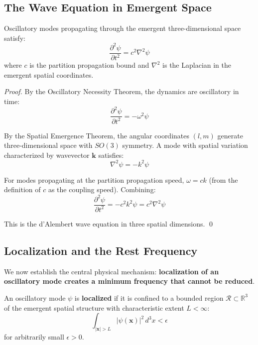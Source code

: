 \subsection{The Wave Equation in Emergent Space}

\begin{theorem}
\label{thm:wave-equation}
Oscillatory modes propagating through the emergent three-dimensional space satisfy:
\begin{equation}
    \frac{\partial^2 \psi}{\partial t^2} = c^2 \nabla^2 \psi
    \label{eq:wave-eq-3d}
\end{equation}
where $c$ is the partition propagation bound and $\nabla^2$ is the Laplacian in the emergent spatial coordinates.
\end{theorem}

\begin{proof}
By the Oscillatory Necessity Theorem, the dynamics are oscillatory in time:
\begin{equation}
    \frac{\partial^2 \psi}{\partial t^2} = -\omega^2 \psi
\end{equation}

By the Spatial Emergence Theorem, the angular coordinates $(l, m)$ generate three-dimensional space with $SO(3)$ symmetry. A mode with spatial variation characterized by wavevector $\mathbf{k}$ satisfies:
\begin{equation}
    \nabla^2 \psi = -k^2 \psi
\end{equation}

For modes propagating at the partition propagation speed, $\omega = ck$ (from the definition of $c$ as the coupling speed). Combining:
\begin{equation}
    \frac{\partial^2 \psi}{\partial t^2} = -c^2 k^2 \psi = c^2 \nabla^2 \psi
\end{equation}

This is the d'Alembert wave equation in three spatial dimensions. \qed
\end{proof}

\subsection{Localization and the Rest Frequency}

We now establish the central physical mechanism: \textbf{localization of an oscillatory mode creates a minimum frequency that cannot be reduced}.

\begin{definition}
\label{def:localized-mode}
An oscillatory mode $\psi$ is \textbf{localized} if it is confined to a bounded region $\mathcal{R} \subset \mathbb{R}^3$ of the emergent spatial structure with characteristic extent $L < \infty$:
\begin{equation}
    \int_{|\mathbf{x}| > L} |\psi(\mathbf{x})|^2 \, d^3x < \epsilon
\end{equation}
for arbitrarily small $\epsilon > 0$.
\end{definition}

